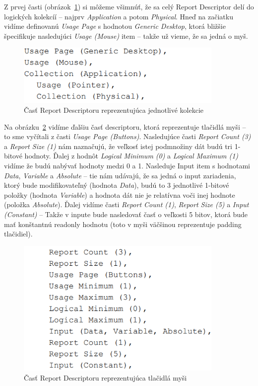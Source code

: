 \newpage

Z prvej časti (obrázok~\ref{obr:kap3:report_desc_collection}) si môžeme všimnúť, že sa celý Report Descriptor delí do logických kolekcíí -- najprv \textit{Application} a potom \textit{Physical}. Hneď na začiatku vidíme definovanú \textit{Usage Page} s hodnotou \textit{Generic Desktop}, ktorá bližšie špecifikuje nasledujúci \textit{Usage (Mouse)} item -- takže už vieme, že sa jedná o myš. 

\begin{figure}[!htb]
	\centering
	\includegraphics[width=10cm]{img/kap03_report_desc_collection}
	\caption{Časť Report Descriptoru reprezentujúca jednotlivé kolekcie}
	\label{obr:kap3:report_desc_collection}
\end{figure}

Na obrázku~\ref{obr:kap3:report_desc_buttons} vidíme ďalšiu časť descriptoru, ktorá reprezentuje tlačidlá myši -- to sme vyčítali z časti \textit{Usage Page (Buttons)}. Nasledujúce časti \textit{Report Count (3)} a \textit{Report Size (1)} nám naznačujú, že veľkosť istej podmnožiny dát budú tri 1-bitové hodnoty. Ďalej z hodnôt \textit{Logical Minimum (0)} a \textit{Logical Maximum (1)} vidíme že budú nabývať hodnoty medzi 0 a 1. Nasleduje Input item s hodnotami \textit{Data}, \textit{Variable} a \textit{Absolute} -- tie nám udávajú, že sa jedná o input zariadenia, ktorý bude modifikovateľný (hodnota \textit{Data}), budú to 3 jednotlivé 1-bitové položky (hodnota \textit{Variable}) a hodnota dát nie je relatívna voči inej hodnote (položka \textit{Absolute}). Ďalej vidíme časti \textit{Report Count (1)}, \textit{Report Size (5)} a \textit{Input (Constant)} -- Takže v inpute bude nasledovať časť o veľkosti 5 bitov, ktorá bude mať konštantnú readonly hodnotu (toto v myši väčšinou reprezentuje padding tlačidiel).

\begin{figure}[!htb]
	\centering
	\includegraphics[width=10cm]{img/kap03_report_desc_buttons}
	\caption{Časť Report Descriptoru reprezentujúca tlačidlá myši}
	\label{obr:kap3:report_desc_buttons}
\end{figure}


